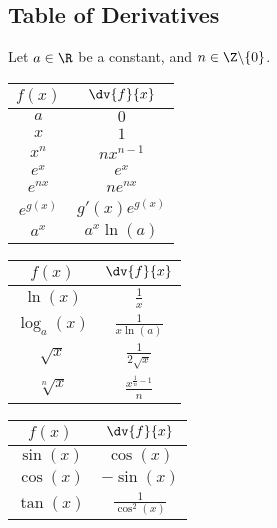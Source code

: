 \documentclass{article}
\renewcommand{\arraystretch}{1.5} %
\begin{document}
\subsection{Table of Derivatives}
Let \(a\in\R\) be a constant, and \(n\in\Z\backslash\{0\}\).
\begin{table}[H]
    \centering
    \renewcommand{\arraystretch}{2.5}
    \begin{tabular}[t]{c c}
        \(f(x)\)      & \(\dv{f}{x}\)      \\[1em]
        \midrule
        \(a\)         & \(0\)              \\
        \(x\)         & \(1\)              \\
        \(x^n\)       & \(n x^{n-1}\)      \\
        \(e^x\)      & \(e^x\)           \\
        \(e^{nx}\)   & \(ne^{nx}\)       \\
        \(e^{g(x)}\) & \(g'(x)e^{g(x)}\) \\
        \(a^x\)       & \(a^x \ln(a)\)     
    \end{tabular}
    \quad
    \begin{tabular}[t]{c c}
        \(f(x)\)                   & \(\dv{f}{x}\)                   \\[1em]
        \midrule
        \(\ln{\left(x\right)}\)    & \(\frac{1}{x}\)                 \\
        \(\log_a{\left(x\right)}\) & \(\frac{1}{x \ln(a)}\)          \\
        \(\sqrt{x}\)               & \(\frac{1}{2 \sqrt{x}}\)        \\[0.5em]
        \(\sqrt[n]{x}\)            & \(\frac{x^{\frac{1}{n}-1}}{n}\)
    \end{tabular}
    \quad
    \begin{tabular}[t]{c c}
        \(f(x)\)                 & \(\dv{f}{x}\)                        \\[1em]
        \midrule
        \(\sin{\left(x\right)}\) & \(\cos{\left(x\right)}\)             \\
        \(\cos{\left(x\right)}\) & \(-\sin{\left(x\right)}\)            \\
        \(\tan{\left(x\right)}\) & \(\frac{1}{\cos^2{\left(x\right)}}\)
    \end{tabular}
\end{table}
\end{document}
